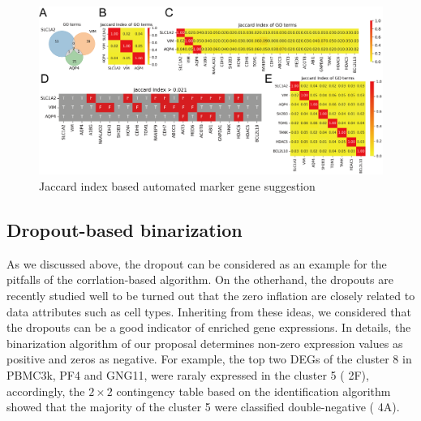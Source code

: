 \documentclass{article}
\begin{document}
\begin{figure}[htb]
  \centering
  \includegraphics[scale=0.7]{./figs/exported/figure_3.png}
  \caption{Jaccard index based automated marker gene suggestion}
  \label{jibased}
\end{figure}


\subsection*{Dropout-based binarization}
As we discussed above, the dropout can be considered as an example for the pitfalls of the corrlation-based algorithm.
On the otherhand, the dropouts are recently studied well to be turned out that the zero inflation are closely related 
to data attributes such as cell types\cite{qiu2020embracing}. Inheriting from these ideas, we considered that the dropouts can be a good 
indicator of enriched gene expressions. In details, the binarization algorithm of our proposal determines non-zero 
expression values as positive and zeros as negative. For example, the top two DEGs of the cluster 8 in PBMC3k, 
PF4 and GNG11, were raraly expressed in the cluster 5 (\figurename{ 2F}), accordingly, the $2\times 2$ contingency table based on 
the identification algorithm showed that the majority of the cluster 5 were classified double-negative (\figurename{ 4A}).
\end{document}
